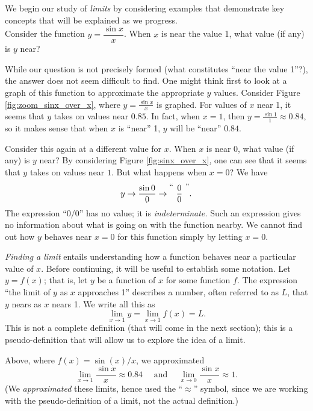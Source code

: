 We begin our study of \textit{limits} by considering examples that demonstrate key concepts that will be explained as we progress.\\

Consider the function $y = \dfrac{\sin x}{x}$. When $x$ is near the value 1, what value (if any) is $y$ near?%

While our question is not precisely formed (what constitutes ``near the value 1''?), the answer does not seem difficult to find. One might think first to look at a graph of this function to approximate the appropriate $y$ values. Consider Figure \ref{fig:zoom_sinx_over_x}, where $y = \frac{\sin x}{x}$ is graphed. For values of $x$ near 1, it seems that $y$ takes on values near $0.85$. In fact, when $x=1$, then $y=\frac{\sin 1}{1} \approx 0.84$, so it makes sense that when $x$ is ``near'' 1, $y$ will be ``near'' $0.84$.

Consider this again at a different value for $x$. When $x$ is near 0, what value (if any) is $y$ near? By considering Figure \ref{fig:sinx_over_x}, one can see that it seems that $y$ takes on values near $1$. But what happens when $x=0$? We have 
\[
 y \rightarrow \frac{\sin 0}{0} \rightarrow \raisebox{8pt}{\text{``\ }}\frac{0}{0}\raisebox{8pt}{\text{\ ''}}.
\] 
The expression ``$0/0$'' has no value; it is \emph{indeterminate.}  Such an expression gives no information about what is going on with the function nearby. We cannot find out how $y$ behaves near $x=0$ for this function simply by letting $x=0$. 

\emph{Finding a limit} entails understanding how a function behaves near a particular value of $x$. Before continuing, it will be useful to establish some notation. Let $y=f(x)$; that is, let $y$ be a function of $x$ for some function $f$. The expression ``the limit of $y$ as $x$ approaches 1'' describes a number, often referred to as $L$, that $y$ nears as $x$ nears 1. We write all this as 
\[
\lim_{x\to 1} y = \lim_{x\to 1} f(x) = L.
\]
This is not a complete definition (that will come in the next section); this is a pseudo-definition that will allow us to explore the idea of a limit. 

Above, where $f(x) = \sin(x)/x$, we approximated 
\[
\lim_{x\to 1} \frac{\sin x}{x} \approx 0.84 \quad \text{ and } \quad \lim_{x\to 0}\frac{\sin x}{x} \approx 1.
\]
(We \textit{approximated} these limits, hence used the ``$\approx$'' symbol, since we are working with the pseudo-definition of a limit, not the actual definition.)

